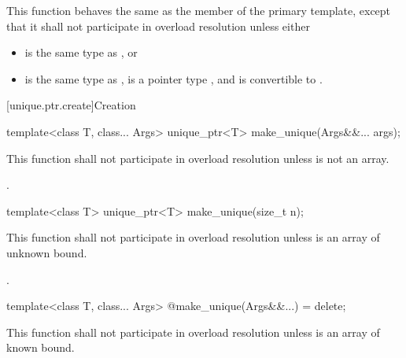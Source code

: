 \begin{itemdescr}
\pnum
This function behaves the same as
the  member of the primary template,
except that it shall not participate in overload resolution
unless either
\begin{itemize}
\item {} is the same type as , or
\item {} is the same type as ,
       is a pointer type , and
       is convertible to .
\end{itemize}
\end{itemdescr}

[unique.ptr.create]{Creation}

%
\begin{itemdecl}
template<class T, class... Args> unique_ptr<T> make_unique(Args&&... args);
\end{itemdecl}

\begin{itemdescr}
\pnum
\remarks
This function shall not participate in overload resolution unless  is not an array.

\pnum
\returns
{}.

\end{itemdescr}

%
\begin{itemdecl}
template<class T> unique_ptr<T> make_unique(size_t n);
\end{itemdecl}

\begin{itemdescr}
\pnum
\remarks
This function shall not participate in overload resolution unless  is an array of unknown bound.

\pnum
\returns
{}.

\end{itemdescr}

%
\begin{itemdecl}
template<class T, class... Args> @\unspec@ make_unique(Args&&...) = delete;
\end{itemdecl}

\begin{itemdescr}
\pnum
\remarks
This function shall not participate in overload resolution unless  is an array of known bound.

\end{itemdescr}

